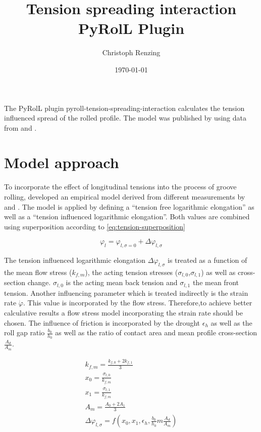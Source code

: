 \documentclass[11pt]{PyRollDocs}
\begin{document}
    \title{Tension spreading interaction PyRolL Plugin}
    \author{Christoph Renzing}
    \date{\today}

    \maketitle

    The PyRolL plugin pyroll-tension-spreading-interaction calculates the tension influenced spread of the rolled profile.
    The model was published by \textcite{Dobler1998, MaukDobler1999} using data from \textcite{Nikkilä1977} and \textcite{Treis1968}.


    \section{Model approach}\label{sec:model-approach}
    To incorporate the effect of longitudinal tensions into the process of groove rolling, \textcite{Dobler1998} developed an empirical model derived from different measurements by \textcite{Nikkilä1977} and \textcite{Treis1968}.
    The model is applied by defining a \enquote{tension free logarithmic elongation} as well as a \enquote{tension influenced logarithmic elongation}.
    Both values are combined using superposition according to \autoref{eq:tension-superposition}

    \begin{equation}
        \varphi_l = \varphi_{l, \sigma=0} + \Delta\varphi_{l, \sigma}
        \label{eq:tension-superposition}
    \end{equation}

    The tension influenced logarithmic elongation $\Delta\varphi_{l, \sigma}$ is treated as a function of the mean flow stress ($k_{f,m}$), the acting tension stresses ($\sigma_{l,0}$,$\sigma_{l,1}$) as well as cross-section change.
    $\sigma_{l,0}$ is the acting mean back tension and $\sigma_{l,1}$ the mean front tension.
    Another influencing parameter which is treated indirectly is the strain rate $\dot{\varphi}$.
    This value is incorporated by the flow stress.
    Therefore,to achieve better calculative results a flow stress model incorporating the strain rate should be chosen.
    The influence of friction is incorporated by the drought $\epsilon_h$ as well as the roll gap ratio $\frac{b_0}{h_0}$ as well as the ratio of contact area and mean profile cross-section $\frac{A_d}{A_m}$.

    \begin{gather}
        k_{f,m} = \frac{k_{f,0} + 2 k_{f,1} }{3} \\
        x_0 = \frac{\sigma_{l, 0}}{k_{f,m}}\\
        x_1 = \frac{\sigma_{l, 1}}{k_{f,m}}\\
        A_m = \frac{A_0 + 2 A_1 }{3} \\
        \Delta\varphi_{l, \sigma} = f \left( x_0, x_1, \epsilon_h, \frac{b_0}{h_0}m \frac{A_d}{A_m} \right)
    \end{gather}
\end{document}
